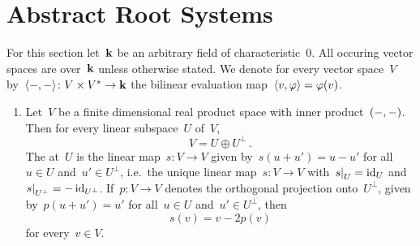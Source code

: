 \section{Abstract Root Systems}


\begin{convention}
  For this section let~$\mathbf{k}$ be an arbitrary field of characteristic~$0$.
  All occuring vector spaces are over~$\mathbf{k}$ unless otherwise stated.
  We denote for every vector space~$V$ by~$\langle-,-\rangle \colon V \times V^* \to \mathbf{k}$ the bilinear evaluation map~$\langle v, \varphi\rangle = \varphi(v)$.
\end{convention}


\begin{recall}
  \leavevmode
  \begin{enumerate}
    \item
      Let~$V$ be a finite dimensional real product space with inner product~$(-,-)$.
      Then for every linear subspace~$U$ of~$V$,
      \[
        V
        =
        U \oplus U^\perp \,.
      \]
      The  at~$U$ is the linear map~$s \colon V \to V$ given by~$s(u + u') = u - u'$ for all~$u \in U$ and~$u' \in U^\perp$, i.e.\ the unique linear map~$s \colon V \to V$ with~$\restrict{s}{U} = \id_U$ and~$\restrict{s}{U^\perp} = - \id_{U^\perp}$.
      If~$p \colon V \to V$ denotes the orthogonal projection onto~$U^\perp$, given by~$p(u + u') = u'$ for all~$u \in U$ and~$u' \in U^\perp$, then
      \[
        s(v)
        =
        v - 2 p(v)
      \]
      for every~$v \in V$.
      

\end{enumerate}
\end{recall}
